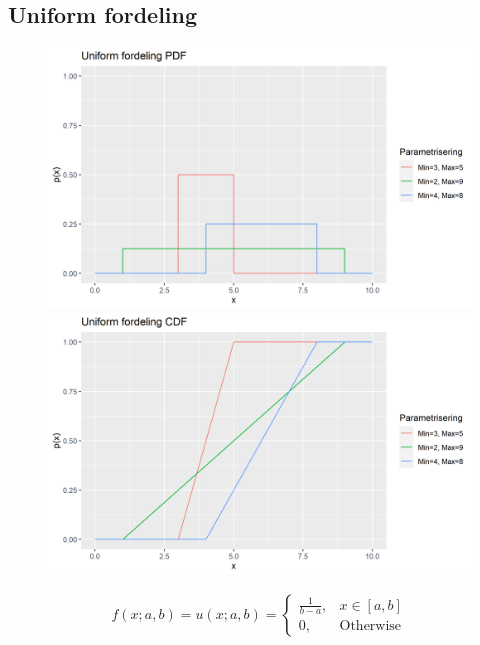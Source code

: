 \subsection{Uniform fordeling}
\begin{figure}[H]
  \centering
  \begin{minipage}[b]{0.49\textwidth}
\includegraphics[width=\textwidth]{bilete/unifpdf.png}
  \end{minipage}
  \hfill
  \begin{minipage}[b]{0.49\textwidth}
    \includegraphics[width=\textwidth]{bilete/unifcdf.png}
  \end{minipage}
\end{figure}

\begin{equation}
    f(x; a, b) = u(x; a, b) = 
    \begin{cases}
    \frac{1}{b - a}, & x \in [a, b] \\
    0, & \text{Otherwise}
    \end{cases}
\end{equation}

